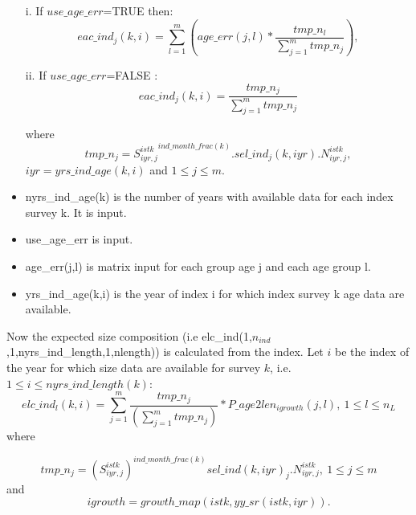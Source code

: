 \documentclass{article}
\begin{document}
\begin{itemize}
        \item [i.] If $use\_age\_err$=TRUE then: 
    \begin{equation}
        eac\_ind_j(k,i)=\sum_{l=1}^m \left(age\_err(j,l)*\dfrac{tmp\_n_l}{\sum_{j=1}^mtmp\_n_j}\right),
    \end{equation}
        \item [ii.] If $use\_age\_err$=FALSE :
        \begin{equation}eac\_ind_j(k,i)=\dfrac{tmp\_n_j}{\sum_{j=1}^mtmp\_n_j}
    \end{equation}

where \begin{equation}
    tmp\_n_j= {S^{istk}_{iyr,j}}^{ind\_month\_frac(k)}.sel\_ind_j(k,iyr).N^{istk}_{iyr,j},
\end{equation}
 $iyr=yrs\_ind\_age(k,i)$ and $1\leq j\leq m$.
    \end{itemize}
\begin{itemize}
    \item nyrs\_ind\_age(k) is the number of years with available data for each  index survey k. It is input. 
    \item use\_age\_err is input.
    \item age\_err(j,l) is matrix input for each group age j and each age group l.
    \item yrs\_ind\_age(k,i) is the year of index i for which index survey k age data are available. 
\end{itemize}


Now the expected size composition (i.e elc\_ind(1,$n_{ind}$,1,nyrs\_ind\_length,1,nlength)) is calculated from the index. Let $i$ be the index of the year for which size data are available for survey $k$, i.e.   $1\leq i \leq nyrs\_ind\_length(k)$:
\begin{equation}
    elc\_ind_l(k,i)=\sum_{j=1}^m\dfrac{tmp\_n_j}{\left(\displaystyle\sum_{j=1}^mtmp\_n_j\right)}*P\_age2len_{igrowth}(j,l), \ 1\leq l \leq n_L
\end{equation}
where

\begin{equation}
    tmp\_n_j= {\left(S^{istk}_{iyr,j}\right)}^{ind\_month\_frac(k)}sel\_ind(k,iyr)_j.N^{istk}_{iyr,j}, \ 1\leq j \leq m
\end{equation}
and
\begin{equation}
    igrowth=growth\_map(istk,yy\_sr(istk,iyr)).    
\end{equation}
\end{document}
